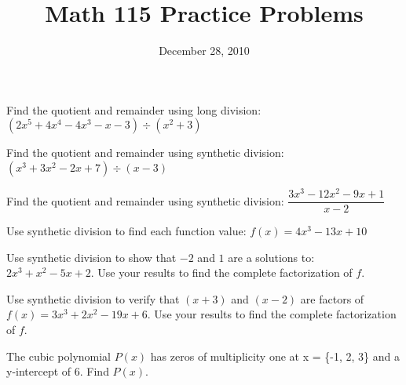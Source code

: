 \documentclass[fleqn,addpoints]{exam}
\title{Math 115 Practice Problems}
\date{December 28, 2010}
\begin{document}
\maketitle

 
\begin{questions}

\question
Find the quotient and remainder using long division: $(2x^5 +4x^4 - 4x^3 - x - 3) \div (x^2+3)$
\begin{solution}[5 cm]
\end{solution}

\question
Find the quotient and remainder using synthetic division: $(x^3 + 3x^2 - 2x + 7) \div (x-3)$
\begin{solution}[5 cm]
\end{solution}

\question
Find the quotient and remainder using synthetic division: $\dfrac{3x^3-12x^2-9x+1}{x-2}$
\begin{solution}[5 cm]
\end{solution}

\pagebreak

\question
Use synthetic division to find each function value: $f(x) = 4x^3 - 13x + 10$


\question
Use synthetic division to show that $-2$ and $1$ are a solutions to: $2x^3+x^2-5x+2$.  Use your results to find the
complete factorization of $f$.
\begin{solution}[5 cm]
\end{solution}

\question
Use synthetic division to verify that $(x+3)$  and $(x-2)$ are factors of $f(x) = 3x^3+2x^2-19x+6$.  Use your results to
find the complete factorization of $f$.

\begin{solution}[5 cm]
\end{solution}

\question
The cubic polynomial $P(x)$ has zeros of multiplicity one at x = \{-1, 2, 3\} and a y-intercept of 6.  Find $P(x)$.


\end{questions}
\end{document}

